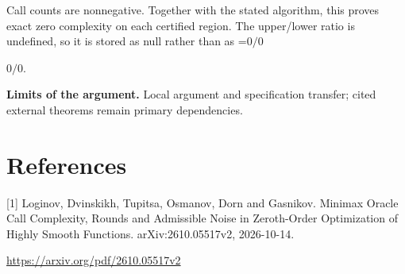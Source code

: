 \documentclass[10pt,a4paper]{article}
\newcommand{\AtlasMath}[1]{\par\begingroup\centering\setbox0=\hbox{$\displaystyle #1$}\ifdim\wd0>1.4\linewidth\typeout{ATLAS WIDE FORMULA: \the\wd0}\fi\ifdim\wd0>\linewidth\resizebox{\linewidth}{!}{\box0}\else\box0\fi\par\endgroup}
\newcommand{\AtlasInlineMath}[1]{\begingroup\setbox0=\hbox{$#1$}\ifdim\wd0>.4\linewidth\endgroup\AtlasMath{#1}\else\endgroup$#1$\fi}
\begin{document}
Call counts are nonnegative. Together with the stated algorithm, this proves exact zero complexity on each certified region. The upper/lower ratio is undefined, so it is stored as null rather than as \AtlasInlineMath{0/0}.

\textbf{Limits of the argument.} Local argument and specification transfer; cited external theorems remain primary dependencies.

\section{References}
[1] Loginov, Dvinskikh, Tupitsa, Osmanov, Dorn and Gasnikov. Minimax Oracle Call Complexity, Rounds and Admissible Noise in Zeroth-Order Optimization of Highly Smooth Functions. arXiv:2610.05517v2, 2026-10-14.

\url{https://arxiv.org/pdf/2610.05517v2}
\end{document}
